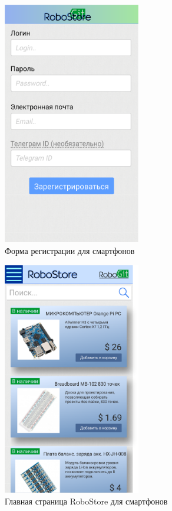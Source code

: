 \documentclass[12pt, a4paper]{article}
\begin{document}
\begin{figure}[H]
  \centering
  \includegraphics[width=6cm]{png/sign_smart.png}
  \caption{Форма регистрации для смартфонов}
\end{figure}

\begin{figure}[H]
  \centering
  \includegraphics[width=6cm]{png/store_main_smart.png}
  \caption{Главная страница RoboStore для смартфонов}
\end{figure}
\end{document}
